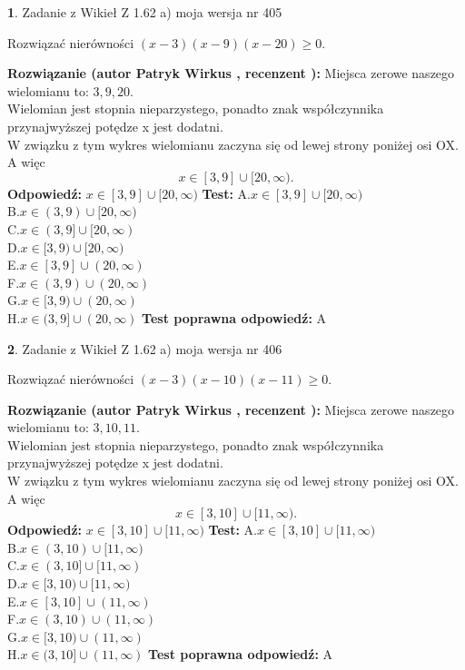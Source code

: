 \documentclass[12pt, a4paper]{article}
\theoremstyle{definition} %
\newtheorem{zad}{}
\newcommand{\zadStart}[1]{\begin{zad}#1\newline}
\newcommand{\zadStop}{\end{zad}}
\newcommand{\rozwStart}[2]{\noindent \textbf{Rozwiązanie (autor #1 , recenzent #2): }\newline}
\newcommand{\rozwStop}{\newline}
\newcommand{\odpStart}{\noindent \textbf{Odpowiedź:}\newline}
\newcommand{\odpStop}{\newline}
\newcommand{\testStart}{\noindent \textbf{Test:}\newline}
\newcommand{\testStop}{\newline}
\newcommand{\kluczStart}{\noindent \textbf{Test poprawna odpowiedź:}\newline}
\newcommand{\kluczStop}{\newline}
\begin{document}
\zadStart{Zadanie z Wikieł Z 1.62 a) moja wersja nr 405}

Rozwiązać nierówności $(x-3)(x-9)(x-20)\ge0$.
\zadStop
\rozwStart{Patryk Wirkus}{}
Miejsca zerowe naszego wielomianu to: $3, 9, 20$.\\
Wielomian jest stopnia nieparzystego, ponadto znak współczynnika przy\linebreak najwyższej potędze x jest dodatni.\\ W związku z tym wykres wielomianu zaczyna się od lewej strony poniżej osi OX. A więc $$x \in [3,9] \cup [20,\infty).$$
\rozwStop
\odpStart
$x \in [3,9] \cup [20,\infty)$
\odpStop
\testStart
A.$x \in [3,9] \cup [20,\infty)$\\
B.$x \in (3,9) \cup [20,\infty)$\\
C.$x \in (3,9] \cup [20,\infty)$\\
D.$x \in [3,9) \cup [20,\infty)$\\
E.$x \in [3,9] \cup (20,\infty)$\\
F.$x \in (3,9) \cup (20,\infty)$\\
G.$x \in [3,9) \cup (20,\infty)$\\
H.$x \in (3,9] \cup (20,\infty)$
\testStop
\kluczStart
A
\kluczStop



\zadStart{Zadanie z Wikieł Z 1.62 a) moja wersja nr 406}

Rozwiązać nierówności $(x-3)(x-10)(x-11)\ge0$.
\zadStop
\rozwStart{Patryk Wirkus}{}
Miejsca zerowe naszego wielomianu to: $3, 10, 11$.\\
Wielomian jest stopnia nieparzystego, ponadto znak współczynnika przy\linebreak najwyższej potędze x jest dodatni.\\ W związku z tym wykres wielomianu zaczyna się od lewej strony poniżej osi OX. A więc $$x \in [3,10] \cup [11,\infty).$$
\rozwStop
\odpStart
$x \in [3,10] \cup [11,\infty)$
\odpStop
\testStart
A.$x \in [3,10] \cup [11,\infty)$\\
B.$x \in (3,10) \cup [11,\infty)$\\
C.$x \in (3,10] \cup [11,\infty)$\\
D.$x \in [3,10) \cup [11,\infty)$\\
E.$x \in [3,10] \cup (11,\infty)$\\
F.$x \in (3,10) \cup (11,\infty)$\\
G.$x \in [3,10) \cup (11,\infty)$\\
H.$x \in (3,10] \cup (11,\infty)$
\testStop
\kluczStart
A
\kluczStop
\end{document}
